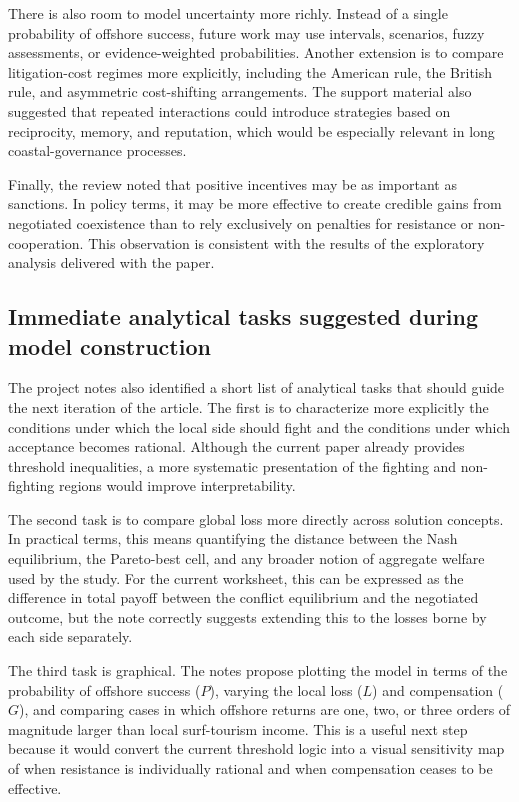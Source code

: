 There is also room to model uncertainty more richly. Instead of a single probability of offshore success, future work may use intervals, scenarios, fuzzy assessments, or evidence-weighted probabilities. Another extension is to compare litigation-cost regimes more explicitly, including the American rule, the British rule, and asymmetric cost-shifting arrangements. The support material also suggested that repeated interactions could introduce strategies based on reciprocity, memory, and reputation, which would be especially relevant in long coastal-governance processes.

Finally, the review noted that positive incentives may be as important as sanctions. In policy terms, it may be more effective to create credible gains from negotiated coexistence than to rely exclusively on penalties for resistance or non-cooperation. This observation is consistent with the results of the exploratory analysis delivered with the paper.

\subsection{Immediate analytical tasks suggested during model construction}

The project notes also identified a short list of analytical tasks that should guide the next iteration of the article. The first is to characterize more explicitly the conditions under which the local side should fight and the conditions under which acceptance becomes rational. Although the current paper already provides threshold inequalities, a more systematic presentation of the fighting and non-fighting regions would improve interpretability.

The second task is to compare global loss more directly across solution concepts. In practical terms, this means quantifying the distance between the Nash equilibrium, the Pareto-best cell, and any broader notion of aggregate welfare used by the study. For the current worksheet, this can be expressed as the difference in total payoff between the conflict equilibrium and the negotiated outcome, but the note correctly suggests extending this to the losses borne by each side separately.

The third task is graphical. The notes propose plotting the model in terms of the probability of offshore success ($P$), varying the local loss ($L$) and compensation ($G$), and comparing cases in which offshore returns are one, two, or three orders of magnitude larger than local surf-tourism income. This is a useful next step because it would convert the current threshold logic into a visual sensitivity map of when resistance is individually rational and when compensation ceases to be effective.
